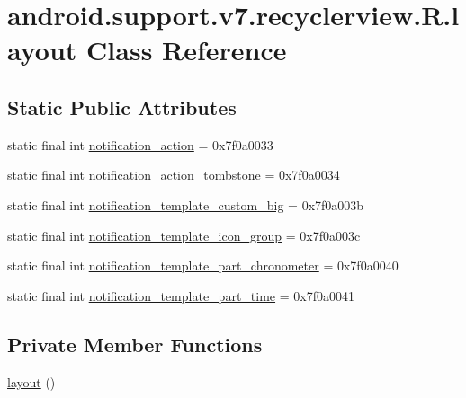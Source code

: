 \hypertarget{classandroid_1_1support_1_1v7_1_1recyclerview_1_1_r_1_1layout}{}\section{android.\+support.\+v7.\+recyclerview.\+R.\+layout Class Reference}
\label{classandroid_1_1support_1_1v7_1_1recyclerview_1_1_r_1_1layout}
\subsection*{Static Public Attributes}
\begin{DoxyCompactItemize}
\item 
static final int \mbox{\hyperlink{classandroid_1_1support_1_1v7_1_1recyclerview_1_1_r_1_1layout_a5c58833d9a1b10d067f374aed5fa88f3}{notification\+\_\+action}} = 0x7f0a0033
\item 
static final int \mbox{\hyperlink{classandroid_1_1support_1_1v7_1_1recyclerview_1_1_r_1_1layout_a7b89a41848c08f64c2517d5457a04b55}{notification\+\_\+action\+\_\+tombstone}} = 0x7f0a0034
\item 
static final int \mbox{\hyperlink{classandroid_1_1support_1_1v7_1_1recyclerview_1_1_r_1_1layout_ac2dc852a8025f03f100cf21a2a854492}{notification\+\_\+template\+\_\+custom\+\_\+big}} = 0x7f0a003b
\item 
static final int \mbox{\hyperlink{classandroid_1_1support_1_1v7_1_1recyclerview_1_1_r_1_1layout_ad5f28c2fee2a8a6a61a5f1e7529e5c07}{notification\+\_\+template\+\_\+icon\+\_\+group}} = 0x7f0a003c
\item 
static final int \mbox{\hyperlink{classandroid_1_1support_1_1v7_1_1recyclerview_1_1_r_1_1layout_aadc2d80b4aa5be9930a4997995d03772}{notification\+\_\+template\+\_\+part\+\_\+chronometer}} = 0x7f0a0040
\item 
static final int \mbox{\hyperlink{classandroid_1_1support_1_1v7_1_1recyclerview_1_1_r_1_1layout_ad713ea9b16efafde2a912cc78ef4bf05}{notification\+\_\+template\+\_\+part\+\_\+time}} = 0x7f0a0041
\end{DoxyCompactItemize}
\subsection*{Private Member Functions}
\begin{DoxyCompactItemize}
\item 
\mbox{\hyperlink{classandroid_1_1support_1_1v7_1_1recyclerview_1_1_r_1_1layout_a2fa854bea74345348bd16f131b111a84}{layout}} ()
\end{DoxyCompactItemize}


